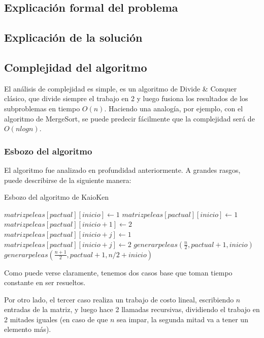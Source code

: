 \subsection{Explicación formal del problema}

\subsection{Explicación de la solución}

\subsection{Complejidad del algoritmo}

El análisis de complejidad es simple, es un algoritmo de Divide \& Conquer clásico, que divide siempre el trabajo en 2 y luego fusiona los resultados de los subproblemas en tiempo $O(n)$. Haciendo una analogía, por ejemplo, con el algoritmo de MergeSort, se puede predecir fácilmente que la complejidad será de $O(nlogn)$.

\subsubsection{Esbozo del algoritmo}

El algoritmo fue analizado en profundidad anteriormente. A grandes rasgos, puede describirse de la siguiente manera:
\begin{algorithm}
\begin{algorithmic}
\caption{Esbozo del algoritmo de KaioKen}
    \State $matrizpeleas[pactual][inicio] \gets 1$
  \EndIf
    \State $matrizpeleas[pactual][inicio] \gets 1$
    \State $matrizpeleas[pactual][inicio + 1] \gets 2$
  \Else
    \For {$j \in [0,..., n)$}
        \State $matrizpeleas[pactual][inicio + j] \gets 1$
      \Else 
        \State $matrizpeleas[pactual][inicio + j] \gets 2$
      \EndIf
    \EndFor
    \State $generarpeleas(\frac{n}{2}, pactual+1, inicio)$
    \State $generarpeleas(\frac{n+1}{2}, pactual+1, n/2 + inicio)$
  \EndIf
  \EndProcedure
\end{algorithmic}
\end{algorithm}

Como puede verse claramente, tenemos dos casos base que toman tiempo constante en ser resueltos.

Por otro lado, el tercer caso realiza un trabajo de costo lineal, escribiendo $n$ entradas de la matriz, y luego hace 2 llamadas recursivas, dividiendo el trabajo en 2 mitades iguales (en caso de que $n$ sea impar, la segunda mitad va a tener un elemento más).

